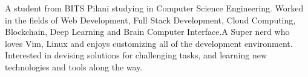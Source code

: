 

\begin{cvparagraph}

A student from BITS Pilani studying in Computer Science Engineering. Worked in the fields of Web Development, Full Stack Development, Cloud Computing, Blockchain, Deep Learning and Brain Computer Interface.A Super nerd who loves Vim, Linux and enjoys customizing all of the development environment. Interested in devising solutions for challenging tasks, and learning new technologies and tools along the way.
\end{cvparagraph}
